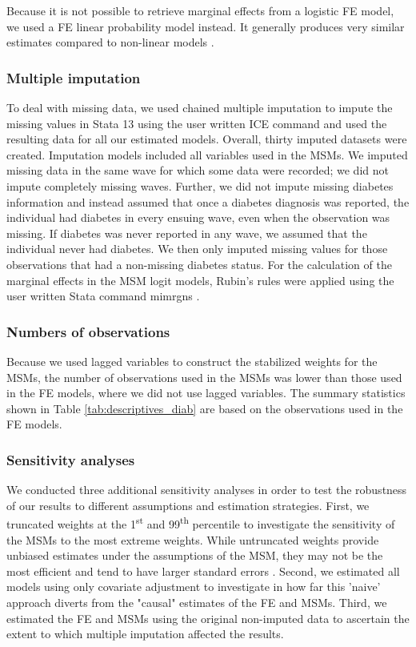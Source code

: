 Because it is not possible to retrieve marginal effects from a logistic \ac{FE} model, we used a \ac{FE} linear probability model instead. It generally produces very similar estimates compared to non-linear models \parencite{Angrist2009a}.

\subsubsection*{Multiple imputation}

To deal with missing data, we used chained multiple imputation to impute the missing values in Stata 13 using the user written ICE command \parencite{Royston2009} and used the resulting data for all our estimated models. Overall, thirty imputed datasets were created. Imputation models included all variables used in the \acp{MSM}. We imputed missing data in the same wave for which some data were recorded; we did not impute completely missing waves. Further, we did not impute missing diabetes information and instead assumed that once a diabetes diagnosis was reported, the individual had diabetes in every ensuing wave, even when the observation was missing. If diabetes was never reported in any wave, we assumed that the individual never had diabetes. We then only imputed missing values for those observations that had a non-missing diabetes status. For the calculation of the marginal effects in the \ac{MSM} logit models, Rubin's rules were applied using the user written Stata command mimrgns \parencite{Klein2014}.

\subsubsection*{Numbers of observations}

Because we used lagged variables to construct the stabilized weights for the \acp{MSM}, the number of observations used in the \acp{MSM} was lower than those used in the \ac{FE} models, where we did not use lagged variables. The summary statistics shown in Table \ref{tab:descriptives_diab} are based on the observations used in the \ac{FE} models.

\subsubsection*{Sensitivity analyses}

We conducted three additional sensitivity analyses in order to test the robustness of our results to different assumptions and estimation strategies.
First, we truncated weights at the 1\textsuperscript{st} and 99\textsuperscript{th} percentile to investigate the sensitivity of the \acp{MSM} to the most extreme weights. While untruncated weights provide unbiased estimates under the assumptions of the \ac{MSM}, they may not be the most efficient and tend to have larger standard errors \parencite{Cole2008}. Second, we estimated all models using only covariate adjustment to investigate in how far this 'naive' approach diverts from the "causal" estimates of the \ac{FE} and \acp{MSM}. Third, we estimated the \ac{FE} and \acp{MSM} using the original non-imputed data to ascertain the extent to which multiple imputation affected the results.


